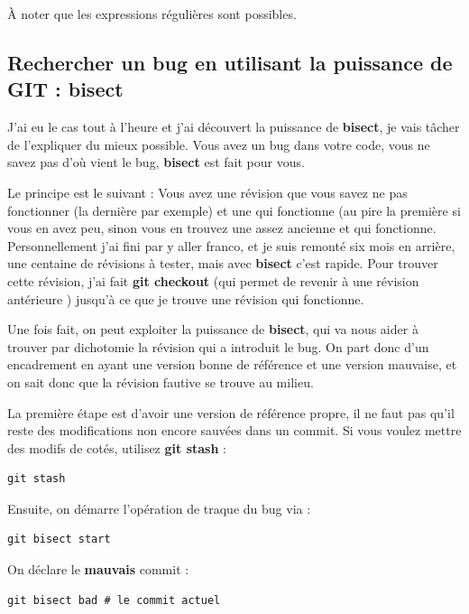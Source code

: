 \documentclass[a4paper,twoside]{article}
\begin{document}
\begin{remarque}
À noter que les expressions régulières sont possibles.
\end{remarque}

\subsection{Rechercher un bug en utilisant la puissance de GIT : bisect}
J'ai eu le cas tout à l'heure et j'ai découvert la puissance de \textbf{bisect}, je vais tâcher de l'expliquer du mieux possible. Vous avez un bug dans votre code, vous ne savez pas d'où vient le bug, \textbf{bisect} est fait pour vous. 

Le principe est le suivant : Vous avez une révision que vous savez ne pas fonctionner (la dernière par exemple) et une qui fonctionne (au pire la première si vous en avez peu, sinon vous en trouvez une assez ancienne et qui fonctionne. Personnellement j'ai fini par y aller franco, et je suis remonté six mois en arrière, une centaine de révisions à tester, mais avec \textbf{bisect} c'est rapide. Pour trouver cette révision, j'ai fait \textbf{git checkout} (qui permet de revenir à une révision antérieure ) jusqu'à ce que je trouve une révision qui fonctionne. 

Une fois fait, on peut exploiter la puissance de \textbf{bisect}, qui va nous aider à trouver par dichotomie la révision qui a introduit le bug. On part donc d'un encadrement en ayant une version bonne de référence et une version mauvaise, et on sait donc que la révision fautive se trouve au milieu.

\bigskip

La première étape est d'avoir une version de référence propre, il ne faut pas qu'il reste des modifications non encore sauvées dans un commit. Si vous voulez mettre des modifs de cotés, utilisez \textbf{git stash} : 
\begin{verbatim}
git stash
\end{verbatim}

Ensuite, on démarre l'opération de traque du bug via :
\begin{verbatim}
git bisect start
\end{verbatim}

On déclare le \textbf{mauvais} commit :
\begin{verbatim}
git bisect bad # le commit actuel
\end{verbatim}
\end{document}
